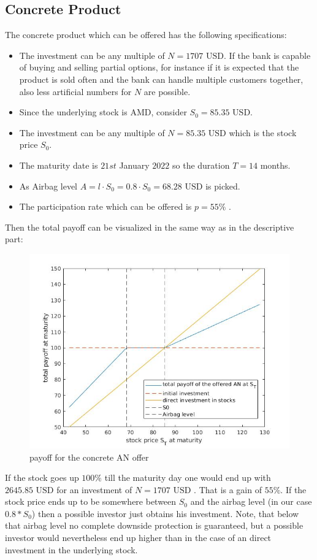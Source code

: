 \documentclass[11pt,oneside,a4paper]{article}
\begin{document}
	\subsection{Concrete Product}
	The concrete product which can be offered has the following specifications:
	\begin{itemize}
		\item The investment can be any multiple of $ N = 1707 \text{ USD} $. If the bank is capable of buying and selling partial options, for instance if it is expected that the product is sold often and the bank can handle multiple customers together, also less artificial numbers for $ N $ are possible. 
		\item Since the underlying stock is AMD, consider $ S_0 = 85.35 \text{ USD} $.
		\item The investment can be any multiple of $ N = 85.35 \text{ USD} $ which is the stock price $ S_0 $.
		\item The maturity date is $ 21st $ January $ 2022 $ so the duration $ T = 14 $ months.
		\item As Airbag level $ A = l \cdot S_0 = 0.8 \cdot S_0  = 68.28 \text{ USD} $ is picked.
		\item The participation rate which can be offered is $ p = 55 \% $ .
	\end{itemize}
	Then the total payoff can be visualized in the same way as in the descriptive part:
	\begin{figure}[H]
		\centering
		\includegraphics[width=0.8\linewidth]{AN_concrete.jpg}
		\caption{payoff for the concrete AN offer}
	\end{figure}
	If the stock goes up $ 100 \% $ till the maturity day one would end up with $ 2645.85 \text{ USD}$ for an investment of  $ N = 1707 \text{ USD} $ . That is a gain of $ 55 \% $. If the stock price ends up to be somewhere between $ S_0 $ and the airbag level (in our case $ 0.8 * S_0 $) then a possible investor just obtains his investment. Note, that below that airbag level no complete downside protection is guaranteed, but a possible investor would nevertheless end up higher than in the case of an direct investment in the underlying stock.
\end{document}
